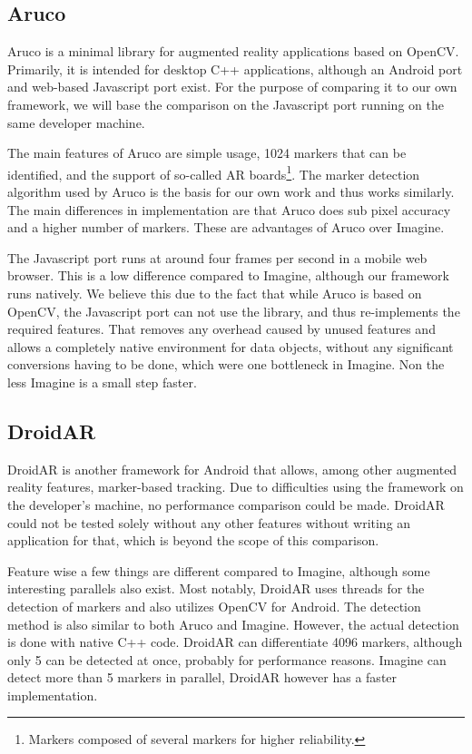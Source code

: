 \subsection{Aruco}

Aruco\cite{aruco} is a minimal library for augmented reality applications based on OpenCV.
Primarily, it is intended for desktop C++ applications, although an Android port and web-based Javascript port exist.
For the purpose of comparing it to our own framework, we will base the comparison on the Javascript port\cite{jsaruco} running on the same developer machine.

The main features of Aruco are simple usage, 1024 markers that can be identified, and the support of so-called AR boards\footnote{Markers composed of several markers for higher reliability.}.
The marker detection algorithm used by Aruco is the basis for our own work and thus works similarly.
The main differences in implementation are that Aruco does sub pixel accuracy and a higher number of markers.
These are advantages of Aruco over Imagine.

The Javascript port runs at around four frames per second in a mobile web browser.
This is a low difference compared to Imagine, although our framework runs natively.
We believe this due to the fact that while Aruco is based on OpenCV, the Javascript port can not use the library, and thus re-implements the required features.
That removes any overhead caused by unused features and allows a completely native environment for data objects, without any significant conversions having to be done, which were one bottleneck in Imagine.
Non the less Imagine is a small step faster.

\subsection{DroidAR}

DroidAR\cite{droidar} is another framework for Android that allows, among other augmented reality features, marker-based tracking.
Due to difficulties using the framework on the developer's machine, no performance comparison could be made.
DroidAR could not be tested solely without any other features without writing an application for that, which is beyond the scope of this comparison.

Feature wise a few things are different compared to Imagine, although some interesting parallels also exist.
Most notably, DroidAR uses threads for the detection of markers and also utilizes OpenCV for Android.
The detection method is also similar to both Aruco and Imagine.
However, the actual detection is done with native C++ code.
DroidAR can differentiate 4096 markers, although only 5 can be detected at once, probably for performance reasons.
Imagine can detect more than 5 markers in parallel, DroidAR however has a faster implementation.
